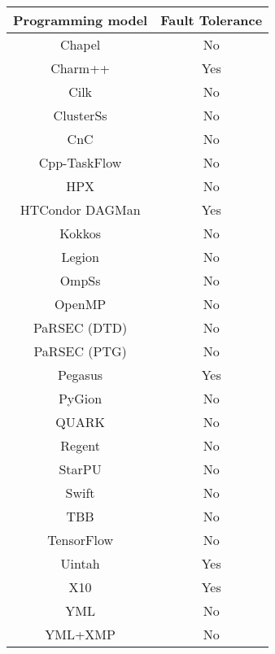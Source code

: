 \begin{tabular}{cc}
\hline
Programming model & Fault Tolerance \\
\hline
Chapel & No\\
Charm++ & Yes\\
Cilk & No\\
ClusterSs & No\\
CnC & No\\
Cpp-TaskFlow & No\\
HPX & No\\
HTCondor DAGMan & Yes\\
Kokkos & No\\
Legion & No\\
OmpSs & No\\
OpenMP & No\\
PaRSEC (DTD) & No\\
PaRSEC (PTG) & No\\
Pegasus & Yes\\
PyGion & No\\
QUARK & No\\
Regent & No\\
StarPU & No\\
Swift & No\\
TBB & No\\
TensorFlow & No\\
Uintah & Yes\\
X10 & Yes\\
YML & No\\
YML+XMP & No\\
\hline
\end{tabular}
